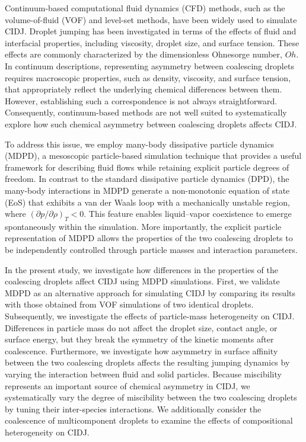 \documentclass[journal=jacsat,manuscript=article]{achemso}
\begin{document}
Continuum-based computational fluid dynamics (CFD) methods, such as the volume-of-fluid (VOF)
and level-set methods, have been widely used to simulate CIDJ.
Droplet jumping has been investigated in terms of the effects of fluid and interfacial properties,
including viscosity, droplet size, and surface tension.
These effects are commonly characterized by the dimensionless Ohnesorge number, $Oh$.
In continuum descriptions, representing asymmetry between coalescing droplets
requires macroscopic properties, such as density, viscosity, and surface tension,
that appropriately reflect the underlying chemical differences between them.
However, establishing such a correspondence is not always straightforward.
Consequently, continuum-based methods are not well suited to
systematically explore how such chemical asymmetry between coalescing
droplets affects CIDJ.

To address this issue, we employ many-body dissipative particle dynamics (MDPD),
a mesoscopic particle-based simulation technique
that provides a useful framework for describing fluid flows
while retaining explicit particle degrees of freedom.
In contrast to the standard dissipative particle dynamics (DPD),
the many-body interactions in MDPD generate a non-monotonic
equation of state (EoS) that exhibits a van der Waals loop
with a mechanically unstable region,
where $(\partial p/\partial \rho)_T < 0$.
This feature enables liquid–vapor coexistence
to emerge spontaneously within the simulation.
More importantly, the explicit particle representation of MDPD
allows the properties of the two coalescing droplets
to be independently controlled through particle masses
and interaction parameters.

In the present study, we investigate how differences in the properties
of the coalescing droplets affect CIDJ using MDPD simulations.
First, we validate MDPD as an alternative approach for simulating
CIDJ by comparing its results with those obtained from
VOF simulations of two identical droplets.
Subsequently, we investigate the effects of particle-mass heterogeneity on CIDJ.
Differences in particle mass do not affect the droplet size,
contact angle, or surface energy, but they break the symmetry
of the kinetic moments after coalescence.
Furthermore, we investigate how asymmetry in surface affinity between
the two coalescing droplets affects the resulting jumping dynamics
by varying the interaction between fluid and solid particles.
Because miscibility represents an important source of chemical asymmetry in CIDJ,
we systematically vary the degree of miscibility between the two coalescing droplets
by tuning their inter-species interactions.
We additionally consider the coalescence of multicomponent
droplets to examine the effects of compositional heterogeneity on CIDJ.
\end{document}
